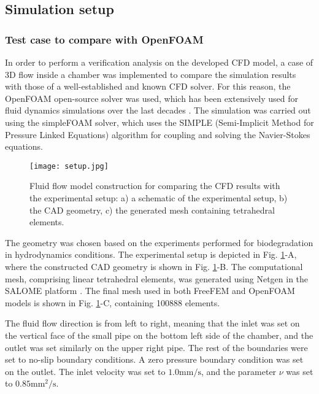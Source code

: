 \subsection{Simulation setup}

\subsubsection{Test case to compare with OpenFOAM}


In order to perform a verification analysis on the developed \gls{CFD} model, a case of 3D flow inside a chamber was implemented to compare the simulation results with those of a well-established and known \gls{CFD} solver. For this reason, the OpenFOAM open-source solver was used, which has been extensively used for fluid dynamics simulations over the last decades \cite{Weller1998}. The simulation was carried out using the simpleFOAM solver, which uses the \gls{SIMPLE} (Semi-Implicit Method for Pressure Linked Equations) algorithm for coupling and solving the Navier-Stokes equations.

\begin{figure}[h]
\centering
\medskip
\texttt{[image: setup.jpg]}
\caption[Fluid flow model construction for comparison with experimental setup]{Fluid flow model construction for comparing the \gls{CFD} results with the experimental setup: a) a schematic of the experimental setup, b) the CAD geometry, c) the generated mesh containing tetrahedral elements.} \label{fig:fluid_setup}
\end{figure}

The geometry was chosen based on the experiments performed for biodegradation in hydrodynamics conditions. The experimental setup is depicted in Fig. \ref{fig:fluid_setup}-A, where the constructed CAD geometry is shown in Fig. \ref{fig:fluid_setup}-B. The computational mesh, comprising linear tetrahedral elements, was generated using Netgen \cite{Schoeberl1997} in the SALOME platform \cite{Ribes2007}. The final mesh used in both FreeFEM and OpenFOAM models is shown in Fig. \ref{fig:fluid_setup}-C, containing \num{100888} elements.

The fluid flow direction is from left to right, meaning that the inlet was set on the vertical face of the small pipe on the bottom left side of the chamber, and the outlet was set similarly on the upper right pipe. The rest of the boundaries were set to no-slip boundary conditions. A zero pressure boundary condition was set on the outlet. The inlet velocity was set to $1.0 \mathrm{mm}/\mathrm{s}$, and the parameter $\nu$ was set to $0.85 \mathrm{mm}^2/\mathrm{s}$.

